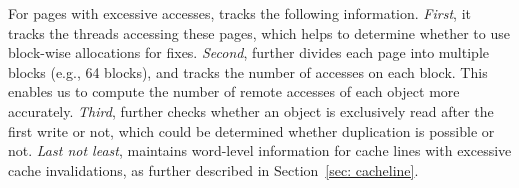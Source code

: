 For pages with excessive accesses, \NP{} tracks the following information. \textit{First}, it tracks the threads accessing these pages, which helps to determine whether to use block-wise allocations for fixes. 
\textit{Second}, \NP{} further 
divides each page into multiple blocks (e.g., 64 blocks), and tracks the number of accesses on each block.  
This enables us to compute the number of remote accesses of each object more accurately. \textit{Third}, \NP{} further checks whether an object is exclusively read after the first write or not, which could be determined whether duplication is possible or not. 
\textit{Last not least}, \NP{} maintains  word-level information for cache lines with excessive cache invalidations, as further described in Section~\ref{sec: cacheline}.



